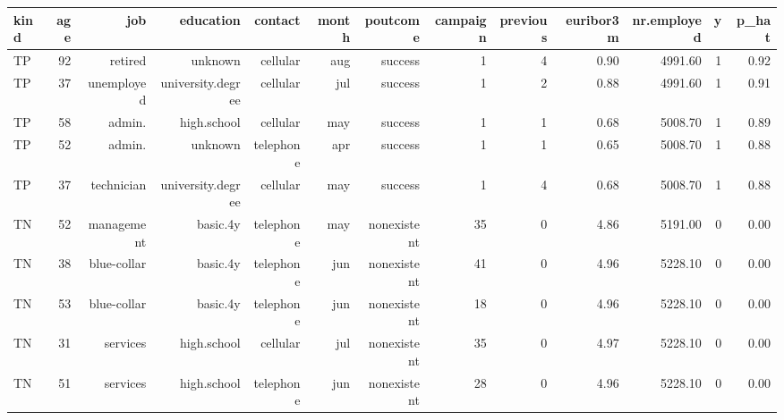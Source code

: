 \begin{tabular}{lrrrrrrrrrrrr}
\toprule
kind & age & job & education & contact & month & poutcome & campaign & previous & euribor3m & nr.employed & y & p\_hat \\
\midrule
TP & 92 & retired & unknown & cellular & aug & success & 1 & 4 & 0.90 & 4991.60 & 1 & 0.92 \\
TP & 37 & unemployed & university.degree & cellular & jul & success & 1 & 2 & 0.88 & 4991.60 & 1 & 0.91 \\
TP & 58 & admin. & high.school & cellular & may & success & 1 & 1 & 0.68 & 5008.70 & 1 & 0.89 \\
TP & 52 & admin. & unknown & telephone & apr & success & 1 & 1 & 0.65 & 5008.70 & 1 & 0.88 \\
TP & 37 & technician & university.degree & cellular & may & success & 1 & 4 & 0.68 & 5008.70 & 1 & 0.88 \\
TN & 52 & management & basic.4y & telephone & may & nonexistent & 35 & 0 & 4.86 & 5191.00 & 0 & 0.00 \\
TN & 38 & blue-collar & basic.4y & telephone & jun & nonexistent & 41 & 0 & 4.96 & 5228.10 & 0 & 0.00 \\
TN & 53 & blue-collar & basic.4y & telephone & jun & nonexistent & 18 & 0 & 4.96 & 5228.10 & 0 & 0.00 \\
TN & 31 & services & high.school & cellular & jul & nonexistent & 35 & 0 & 4.97 & 5228.10 & 0 & 0.00 \\
TN & 51 & services & high.school & telephone & jun & nonexistent & 28 & 0 & 4.96 & 5228.10 & 0 & 0.00 \\
\bottomrule
\end{tabular}